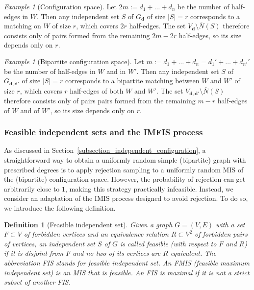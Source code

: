 \documentclass{article}
\theoremstyle{plain}
\theoremstyle{remark}
\newtheorem{example}[theorem]{Example}
\theoremstyle{plain}
\newtheorem{definition}[theorem]{Definition}
\numberwithin{equation}{section}
\renewcommand{\d}{{\boldsymbol{d}}}
\begin{document}
	\begin{example}[Configuration space]
		Let $2m:=d_1+\ldots+d_n$ be the number of half-edges in $W$. Then any independent set $S$ of $G_\d$ of size $|S|=r$ corresponds to a matching on $W$ of size $r$, which covers $2r$ half-edges. The set $V_\d\setminus\overline{N}(S)$ therefore consists only of pairs formed from the remaining $2m-2r$ half-edges, so its size depends only on $r$.
	\end{example}
	
	\begin{example}[Bipartite configuration space]
		Let $m:=d_1+\ldots+d_n=d_1'+\ldots+d_{n'}'$ be the number of half-edges in $W$ and in $W'$. Then any independent set $S$ of $G_{\d,\d'}$ of size $|S|=r$ corresponds to a bipartite matching between $W$ and $W'$ of size $r$, which covers $r$ half-edges of both $W$ and $W'$. The set $V_{\d,\d'}\setminus\overline{N}(S)$ therefore consists only of pairs pairs formed from the remaining $m-r$ half-edges of $W$ and of $W'$, so its size  depends only on $r$.
	\end{example}
	
	\subsubsection{Feasible independent sets and the IMFIS process}\label{subsection_independent_feasible}
	
	As discussed in Section~\ref{subsection_independent_configuration}, a straightforward way to obtain a uniformly random simple (bipartite) graph with prescribed degrees is to apply rejection sampling to a uniformly random MIS of the (bipartite) configuration space. However, the probability of rejection can get arbitrarily close to $1$, making this strategy practically infeasible. Instead, we consider an adaptation of the IMIS process designed to avoid rejection. To do so, we introduce the following definition.
	
	\begin{definition}[Feasible independent set]\label{definition_feasible}
		Given a graph $G=(V,E)$ with a set $F\subset V$ of forbidden vertices and an equivalence relation $R\subset V^2$ of forbidden pairs of vertices, an independent set $S$ of $G$ is called \emph{feasible} (with respect to $F$ and $R$) if it is disjoint from $F$ and no two of its vertices are $R$-equivalent. The abbreviation \emph{FIS} stands for feasible independent set. An \emph{FMIS} (feasible maximum independent set) is an MIS that is feasible. An FIS is \emph{maximal} if it is not a strict subset of another FIS.
	\end{definition}
	
\end{document}
